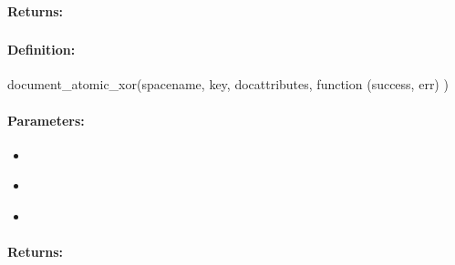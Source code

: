\paragraph{Returns:}


\pagebreak
\subsubsection{}
\label{api:nodejs:document_atomic_xor}


\paragraph{Definition:}
\begin{javascriptcode}
document_atomic_xor(spacename, key, docattributes, function (success, err) {})
\end{javascriptcode}
\paragraph{Parameters:}
\begin{itemize}[noitemsep]
\item {}\\

\item {}\\

\item {}\\

\end{itemize}

\paragraph{Returns:}


\pagebreak
\subsubsection{}
\label{api:nodejs:document_atomic_or}


